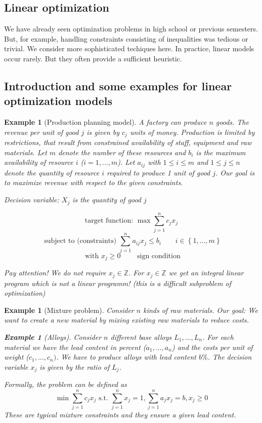 \documentclass[a4paper]{article}
\numberwithin{lecref}{section}
\newcounter{exercises}
\newtheorem{example}[exercises]{Example}
\newtheorem*{Example}{Example}
\newcommand{\Set}[1]{\left\{#1\right\}}
\begin{document}
\subsection{Linear optimization}

We have already seen optimization problems in high school or previous semesters.
But, for example, handling constraints consisting of inequalities was tedious or trivial.
We consider more sophisticated techiques here.
In practice, linear models occur rarely. But they often provide a sufficient heuristic.

\subsection{Introduction and some examples for linear optimization models}

\begin{example}[Production planning model]
	\label{example:1}
	A factory can produce $n$ goods.
	The revenue per unit of good $j$ is given by $c_j$ units of money.
	Production is limited by restrictions, that result from constrained availability of staff, equipment and raw materials.
	Let $m$ denote the number of these resources and $b_i$ is the maximum availability of resource $i$ ($i = 1, \dots, m$).
	Let $a_{ij}$ with $1 \leq i \leq m$ and $1 \leq j \leq n$ denote the quantity of resource $i$ required to produce 1 unit of good $j$.
	Our goal is to maximize revenue with respect to the given constraints.

	\emph{Decision variable:} $X_j$ is the quantity of good $j$

	\[ \text{target function: } \max \sum_{j=1}^n c_j x_j \]
	\[ \text{ subject to (constraints) } \sum_{j=1}^n a_{ij} x_j \leq b_i \qquad i \in \Set{1, \dots, m} \]
	\[ \text{ with } x_j \geq 0 \qquad \text{ sign condition} \]

	Pay attention! We do not require $x_j \in \mathbb Z$. For $x_j \in \mathbb Z$ we get an integral linear program which is \emph{not} a linear programm! (this is a difficult subproblem of optimization)
\end{example}

\begin{example}[Mixture problem]
	\label{example:2}
	Consider $n$ kinds of raw materials. Our goal: We want to create a new material by mixing existing raw materials to reduce costs.

	\begin{Example}[Alloys]
		Consider $n$ different base alloys $L_1, \dots, L_n$.
		For each material we have the lead content in percent ($a_1, \dots, a_n$) and the costs per unit of weight ($c_1, \dots, c_n)$.
		We have to produce alloys with lead content $b \%$.
		The decision variable $x_j$ is given by the ratio of $L_j$.

		Formally, the problem can be defined as
		\[ \min{\sum_{j=1}^n c_j x_j} \text{ s.t. } \sum_{j=1}^n x_j = 1, \sum_{j=1}^n a_j x_j = b, x_j \geq 0 \]
		These are typical mixture constraints and they ensure a given lead content.
	\end{Example}
\end{example}
\end{document}
